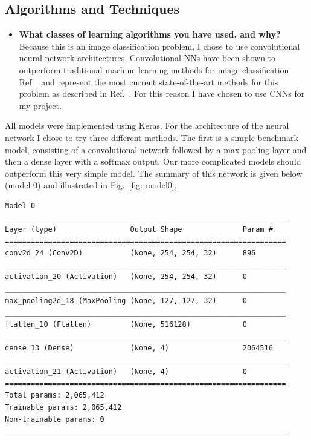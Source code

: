 \documentclass[10pt,a4paper]{article}
\begin{document}
\newpage
\subsection{Algorithms and Techniques}
%

\begin{itemize}
\item {\bf What classes of learning algorithms you have used, and why?}\\
Because this is an image classification problem, I chose to use convolutional neural network architectures.
Convolutional NNs have been shown to outperform traditional machine learning methods for image classification Ref.~\cite{Krizhevsky_2012} and represent the most current state-of-the-art methods for this problem as described in Ref.~\cite{Russakovsky_2015}. For this reason I have chosen to use CNNs for my project.
\end{itemize}

All models were implemented using Keras. For the architecture of the neural network I chose to try three different methods. The first is a simple benchmark model, consisting of a convolutional network followed by a max pooling layer and then a dense layer with a softmax output. Our more complicated models should outperform this very simple model. The summary of this network is given below (model 0) and illustrated in Fig.~\ref{fig: model0},\\
\begin{lstlisting}
Model 0
_________________________________________________________________
Layer (type)                 Output Shape              Param #   
=================================================================
conv2d_24 (Conv2D)           (None, 254, 254, 32)      896       
_________________________________________________________________
activation_20 (Activation)   (None, 254, 254, 32)      0         
_________________________________________________________________
max_pooling2d_18 (MaxPooling (None, 127, 127, 32)      0         
_________________________________________________________________
flatten_10 (Flatten)         (None, 516128)            0         
_________________________________________________________________
dense_13 (Dense)             (None, 4)                 2064516   
_________________________________________________________________
activation_21 (Activation)   (None, 4)                 0         
=================================================================
Total params: 2,065,412
Trainable params: 2,065,412
Non-trainable params: 0
_________________________________________________________________
\end{lstlisting}
\end{document}
